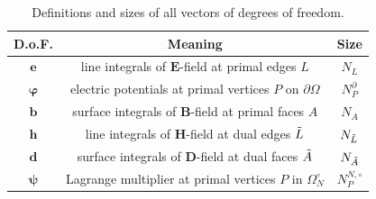 \documentclass{article}
\begin{document}
\begin{table}[]
    \centering
\begin{tabular}{c c c}
     \hline
     D.o.F.  & Meaning  & Size \\
     \hline
     $\mathbf{e}$ & line integrals of $\mathbf{E}$-field at primal edges $L$& $N_L$ \\
     $\bm{\varphi}$ & electric potentials at primal vertices $P$ on $\partial\Omega$ & $N_P^\partial$ \\
     $\mathbf{b}$ & surface integrals of $\mathbf{B}$-field at primal faces $A$ & $N_A$ \\
     $\mathbf{h}$ & line integrals of $\mathbf{H}$-field at dual edges $\Tilde{L}$ & $N_{\Tilde{L}}$ \\
     $\mathbf{d}$ & surface integrals of $\mathbf{D}$-field at dual faces $\Tilde{A}$ & $N_{\Tilde{A}}$ \\
     $\bm{\psi}$ & Lagrange multiplier at primal vertices $P$ in $\Omega_N^\circ$ & $N^{N,\circ}_P$\\ 
     \hline
\end{tabular}
    \caption{Definitions and sizes of all vectors of degrees of freedom.}
    \label{tab:def_size_var}
\end{table}
\end{document}
